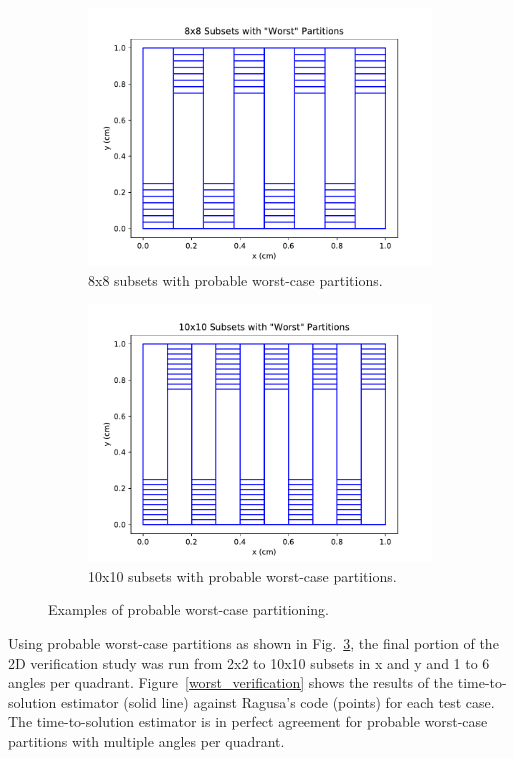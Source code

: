 \documentclass[times,final]{elsarticle}
\begin{document}
\begin{figure}[H]
\begin{subfigure}[b]{0.45\textwidth}
  \includegraphics[width=\textwidth]{../Dissertation/cut_line_files/8_worst.pdf}
  \caption{8x8 subsets with probable worst-case partitions.}
  \label{8random}
\end{subfigure}
\begin{subfigure}[b]{0.45\textwidth}
  \includegraphics[width=\textwidth]{../Dissertation/cut_line_files/10_worst.pdf}
  \caption{10x10 subsets with probable worst-case partitions.}
  \label{10random}
\end{subfigure}
\caption{Examples of probable worst-case partitioning.}
\label{worst_partitions}
\end{figure}
Using probable worst-case partitions as shown in Fig.~\ref{worst_partitions}, the final portion of the 2D verification study was run from 2x2 to 10x10 subsets in x and y and 1 to 6 angles per quadrant.  Figure~\ref{worst_verification} shows the results of the time-to-solution estimator (solid line) against Ragusa's code (points) for each test case. The time-to-solution estimator is in perfect agreement for probable worst-case partitions with multiple angles per quadrant.
\end{document}
